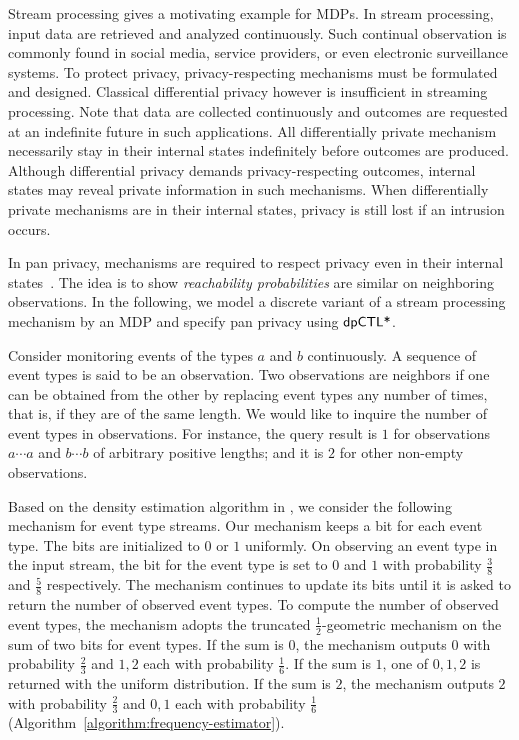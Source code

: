 
Stream processing gives a motivating example for MDPs. In stream
processing, input data are retrieved and
analyzed continuously. Such continual observation is commonly found
in social media, service providers, or even electronic surveillance
systems. To protect privacy, privacy-respecting mechanisms must be
formulated and designed. Classical differential privacy however is
insufficient in streaming processing. Note that data are collected
continuously and outcomes are requested at an indefinite future
in such applications. All differentially private
mechanism necessarily stay in their internal states indefinitely
before outcomes are produced. Although differential privacy demands
privacy-respecting outcomes, internal states may reveal private
information in such mechanisms. When differentially private mechanisms
are in their internal states, privacy is still lost if an intrusion
occurs.

In pan privacy, mechanisms are required to respect
privacy even in their internal states~\cite{DNPR:10:DPCO,DNPRY:10:PPSA}.
The idea is to show \emph{reachability probabilities} are similar on
neighboring observations. In the following, we model a discrete
variant of a stream processing mechanism by an MDP and
specify pan privacy using $\textsf{dpCTL*}$.

Consider monitoring events of the types $a$ and $b$ continuously.
A sequence of event types is said to be an observation. Two
observations are {neighbors} if one can be obtained from the other
by replacing event types any number of times, that is, if they are of
the same length. %
We would like to inquire the number of event types in
observations. For instance, the query result is $1$
for observations $a \cdots a$ and $b \cdots b$ of arbitrary positive
lengths; and it is $2$ for other non-empty observations.

Based on the density estimation algorithm in \cite{DNPRY:10:PPSA}, we
consider the following mechanism for event type streams. Our mechanism
keeps a bit for each event type. The bits are initialized to $0$ or
$1$ uniformly. On observing an event type in the input stream, the
bit for the event type is set to $0$ and $1$ with probability
$\frac{3}{8}$ and $\frac{5}{8}$ respectively. The mechanism continues
to update its bits until it is asked to return the number of observed
event types. To compute the number of observed event types, the
mechanism adopts the truncated $\frac{1}{2}$-geometric mechanism on the sum of
two bits for event types. If the sum is $0$, the mechanism outputs $0$
with probability $\frac{2}{3}$ and $1, 2$ each with probability
$\frac{1}{6}$. If the sum is $1$, one of $0, 1, 2$ is returned with
the uniform distribution. If the sum is $2$, the mechanism outputs $2$
with probability $\frac{2}{3}$ and $0, 1$ each with probability
$\frac{1}{6}$ (Algorithm~\ref{algorithm:frequency-estimator}).


